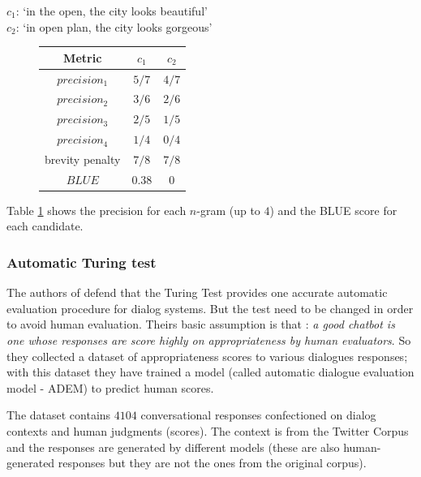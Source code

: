 \begin{center}
$c_1$: `in the open, the city looks beautiful'\\
$c_2$: `in open plan, the city looks gorgeous'\\
\end{center}

\begin{figure}
\label{bluetable}
\begin{center}
\begin{tabular}{|c|c|c|}
\hline
\cellcolor{blue!10} Metric& \cellcolor{blue!10} $c_1$ & \cellcolor{blue!10} $c_2$ \\ \hline
\cellcolor{blue!10} $precision_1$& $5/7$ & $4/7$ \\ \hline
\cellcolor{blue!10} $precision_2$& $3/6$ & $2/6$  \\ \hline
\cellcolor{blue!10} $precision_3$& $2/5$ & $1/5$  \\ \hline
\cellcolor{blue!10} $precision_4$& $1/4$ & $0/4$  \\ \hline
\cellcolor{blue!10} brevity penalty& $7/8$ & $7/8$  \\ \hline
\cellcolor{blue!10} $BLUE$& $0.38$ & $0$ \\ \hline
\end{tabular}
\end{center}
\end{figure}


Table \ref{bluetable} shows the precision for each $n$-gram (up to $4$) and the BLUE score for each candidate.



\subsubsection{Automatic Turing test}

The authors of \cite{Lowe:2016} defend that the Turing Test \cite{Turing} provides one accurate automatic evaluation procedure for dialog systems. But the test need to be changed in order to avoid human evaluation. Theirs basic assumption is that : \textit{a good chatbot is one whose responses are score highly on appropriateness by human evaluators}. So they collected a dataset of appropriateness scores to various dialogues responses; with this dataset they have trained a model (called automatic dialogue evaluation model - ADEM) to predict human scores.

\par The dataset contains $4104$ conversational responses confectioned on dialog contexts and human judgments (scores). The context is from the Twitter Corpus and the responses are generated by different models (these are also human-generated responses but they are not the ones from the original corpus).

